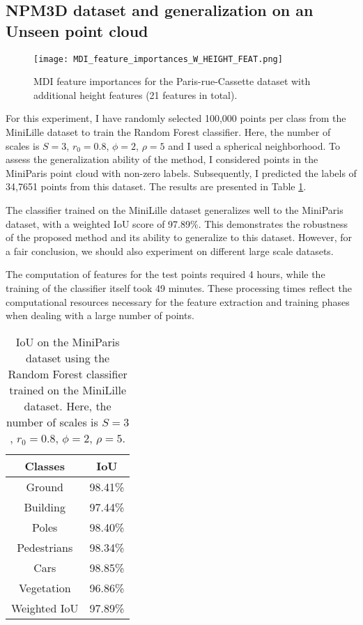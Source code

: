 \documentclass{article}
\begin{document}
\subsection{NPM3D dataset and generalization on an Unseen point cloud}\label{sec:generalization}

\begin{figure}
    \hspace*{-2cm}
        \texttt{[image: MDI\_feature\_importances\_W\_HEIGHT\_FEAT.png]}
    \caption{MDI feature importances for the Paris-rue-Cassette dataset with additional height features (21 features in total).}
    \label{fig:MDI_height}
\end{figure}

For this experiment, I have randomly selected 100,000 points per class from the MiniLille dataset to train the Random Forest classifier. Here, the number of scales is $S=3$, $r_0=0.8$, $\phi=2$, $\rho=5$ and I used a spherical neighborhood. To assess the generalization ability of the method, I considered points in the MiniParis point cloud with non-zero labels. Subsequently, I predicted the labels of 34,7651 points from this dataset. The results are presented in Table \ref{tab:results_generalization}. 

The classifier trained on the MiniLille dataset generalizes well to the MiniParis dataset, with a weighted IoU score of 97.89\%. This demonstrates the robustness of the proposed method and its ability to generalize to this dataset. However, for a fair conclusion, we should also experiment on different large scale datasets. 

The computation of features for the test points required 4 hours, while the training of the classifier itself took 49 minutes. These processing times reflect the computational resources necessary for the feature extraction and training phases when dealing with a large number of points.


\begin{table}[H]
    \centering
\begin{tabular}{cc}
    Classes & IoU \\
    \hline\hline
    Ground & 98.41\% \\
    Building & 97.44\% \\
    Poles & 98.40\% \\
    Pedestrians & 98.34\% \\
    Cars & 98.85\% \\
    Vegetation & 96.86\% \\
    \hline 
    Weighted IoU & 97.89\% \\
\end{tabular}
\caption{IoU on the MiniParis dataset using the Random Forest classifier trained on the MiniLille dataset. Here, the number of scales is $S=3$, $r_0=0.8$, $\phi=2$, $\rho=5$.}
\label{tab:results_generalization}
\end{table}
\end{document}
